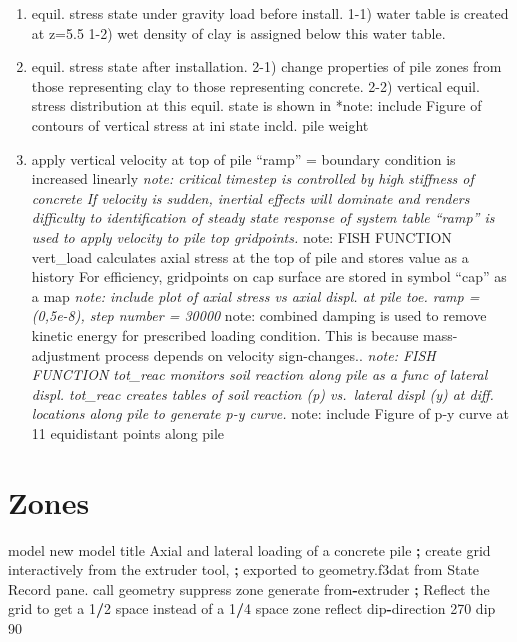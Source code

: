 \documentclass[a4paper, nobind]{templates/ociamthesis}
\providecommand{\tightlist}{%
  \setlength{\itemsep}{0pt}\setlength{\parskip}{0pt}}
\newenvironment{Shaded}{\begin{snugshade}}{\end{snugshade}}
\newcommand{\DecValTok}[1]{\textcolor[rgb]{0.00,0.00,0.81}{#1}}
\newcommand{\ImportTok}[1]{#1}
\newcommand{\NormalTok}[1]{#1}
\newcommand{\OperatorTok}[1]{\textcolor[rgb]{0.81,0.36,0.00}{\textbf{#1}}}
\newcommand{\StringTok}[1]{\textcolor[rgb]{0.31,0.60,0.02}{#1}}
\renewenvironment{Shaded}
{
  \vspace{10pt}%
  \begin{snugshade}%
}{%
  \end{snugshade}%
  \vspace{8pt}%
}
\begin{document}
\begin{enumerate}
\def\labelenumi{\arabic{enumi})}
\tightlist
\item
  equil. stress state under gravity load before install.
  1-1) water table is created at z=5.5
  1-2) wet density of clay is assigned below this water table.
\item
  equil. stress state after installation.
  2-1) change properties of pile zones from those
  representing clay to those representing concrete.
  2-2) vertical equil. stress distribution at this equil. state is shown in
  *note: include Figure of contours of vertical stress at ini state incld. pile weight
\item
  apply vertical velocity at top of pile
  ``ramp'' = boundary condition is increased linearly
  \emph{note: critical timestep is controlled by high stiffness of concrete
  If velocity is sudden, inertial effects will dominate and renders difficulty to identification of steady state response of system
  table ``ramp'' is used to apply velocity to pile top gridpoints.
  }note: FISH FUNCTION vert\_load calculates axial stress at the top of pile and stores value as a history
  For efficiency, gridpoints on cap surface are stored in symbol ``cap'' as a map
  \emph{note: include plot of axial stress vs axial displ. at pile toe. ramp = (0,5e-8), step number = 30000
  }note: combined damping is used to remove kinetic energy for prescribed loading condition. This is because mass-adjustment process depends on velocity sign-changes..
  \emph{note: FISH FUNCTION tot\_reac monitors soil reaction along pile as a func of lateral displ. tot\_reac creates tables of soil reaction (p) vs.~lateral displ (y) at diff. locations along pile to generate p-y curve.
  }note: include Figure of p-y curve at 11 equidistant points along pile
\end{enumerate}

\hypertarget{zones}{%
\section{Zones}\label{zones}}

\begin{Shaded}
\begin{Highlighting}[]
\NormalTok{model new}
\NormalTok{model title }\StringTok{\textquotesingle{}Axial and lateral loading of a concrete pile\textquotesingle{}}
\OperatorTok{;}\NormalTok{ create grid interactively }\ImportTok{from}\NormalTok{ the extruder tool, }
\OperatorTok{;}\NormalTok{ exported to geometry.f3dat }\ImportTok{from}\NormalTok{ State Record pane.}
\NormalTok{call }\StringTok{\textquotesingle{}geometry\textquotesingle{}}\NormalTok{ suppress}
\NormalTok{zone generate }\ImportTok{from}\OperatorTok{{-}}\NormalTok{extruder}
\OperatorTok{;}\NormalTok{ Reflect the grid to get a }\DecValTok{1}\OperatorTok{/}\DecValTok{2}\NormalTok{ space instead of a }\DecValTok{1}\OperatorTok{/}\DecValTok{4}\NormalTok{ space}
\NormalTok{zone reflect dip}\OperatorTok{{-}}\NormalTok{direction }\DecValTok{270}\NormalTok{ dip }\DecValTok{90}
\end{Highlighting}
\end{Shaded}
\end{document}
